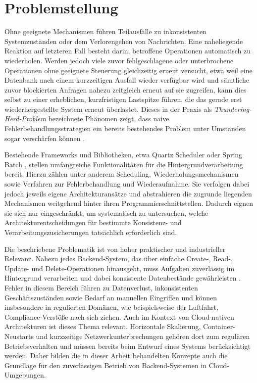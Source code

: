 \section{Problemstellung}
\label{sec:problemstellung}
Ohne geeignete Mechanismen führen Teilausfälle zu inkonsistenten Systemzuständen oder dem Verlorengehen von Nachrichten.
Eine naheliegende Reaktion auf letzteren Fall besteht darin, betroffene Operationen automatisch zu wiederholen.
Werden jedoch viele zuvor fehlgeschlagene oder unterbrochene Operationen ohne geeignete Steuerung gleichzeitig erneut versucht,
etwa weil eine Datenbank nach einem kurzzeitigen Ausfall wieder verfügbar wird und sämtliche zuvor blockierten Anfragen
nahezu zeitgleich erneut auf sie zugreifen, kann dies selbst zu einer erheblichen, kurzfristigen Lastspitze führen, die
das gerade erst wiederhergestellte System erneut überlastet.
Dieses in der Praxis als \textit{Thundering-Herd-Problem} bezeichnete Phänomen zeigt, dass naive Fehlerbehandlungsstrategien
ein bereits bestehendes Problem unter Umständen sogar verschärfen können \parencite[Kap.~4]{newman_building_2026}.

Bestehende Frameworks und Bibliotheken, etwa Quartz Scheduler \parencite{terracotta_inc_hrsg_quartz_2026}
oder Spring Batch \parencite{broadcom_inc_hrsg_spring_2026}, stellen umfangreiche Funktionalitäten für die Hintergrundverarbeitung bereit.
Hierzu zählen unter anderem Scheduling, Wiederholungsmechanismen sowie Verfahren zur Fehlerbehandlung und Wiederaufnahme.
Sie verfolgen dabei jedoch jeweils eigene Architekturansätze und abstrahieren die zugrunde liegenden Mechanismen weitgehend
hinter ihren Programmierschnittstellen.
Dadurch eignen sie sich nur eingeschränkt, um systematisch zu untersuchen, welche Architekturentscheidungen für bestimmte
Konsistenz- und Verarbeitungszusicherungen tatsächlich erforderlich sind.

Die beschriebene Problematik ist von hoher praktischer und industrieller Relevanz.
Nahezu jedes Backend-System, das über einfache Create-, Read-, Update- und Delete-Operationen hinausgeht, muss Aufgaben
zuverlässig im Hintergrund verarbeiten und dabei konsistente Datenbestände gewährleisten \parencite[Kap.~4]{richardson_microservices_2018}.
Fehler in diesem Bereich führen zu Datenverlust, inkonsistenten Geschäftszuständen sowie Bedarf an manuellen Eingriffen und
können insbesondere in regulierten Domänen, wie beispielsweise der Luftfahrt, Compliance-Verstöße nach sich ziehen.
Auch im Kontext von Cloud-nativen Architekturen ist dieses Thema relevant.
Horizontale Skalierung, Container-Neustarts und kurzzeitige Netzwerkunterbrechungen gehören dort zum regulären Betriebsverhalten
\parencite{microsoft_corporation_hrsg_best_2026-1} und müssen bereits beim Entwurf eines Systems berücksichtigt werden.
Daher bilden die in dieser Arbeit behandelten Konzepte auch die Grundlage für den zuverlässigen Betrieb von Backend-Systemen in Cloud-Umgebungen.

